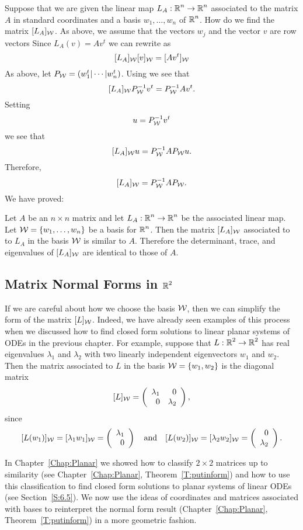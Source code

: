 \documentclass{ximera}
\begin{document}
Suppose that we are given the linear map $L_A:\mbox{$\Bbb{R}$}^n\to\mbox{$\Bbb{R}$}^n$ associated to
the matrix $A$ in standard coordinates and a basis $w_1,\ldots,w_n$ of $\mbox{$\Bbb{R}$}^n$.
How do we find the matrix $[L_A]_{\cal W}$. As above, we assume that the
vectors $w_j$ and the vector $v$ are row vectors  Since $L_A(v)=Av^t$ we can
rewrite  as
\[
[L_A]_{\cal W}[v]_{\cal W} = [Av^t]_{\cal W}
\]
As above, let $P_{\cal W}=(w_1^t|\cdots|w_n^t)$.  Using  we
see that
\[
[L_A]_{\cal W}P_{\cal W}^{-1} v^t = P_{\cal W}^{-1} Av^t.
\]
Setting
\[
u= P_{\cal W}^{-1} v^t
\]
we see that
\[
[L_A]_{\cal W}u = P_{\cal W}^{-1} A P_{\cal W}u.
\]
Therefore,
\[
[L_A]_{\cal W} = P_{\cal W}^{-1} AP_{\cal W}.
\]
We have proved:
\begin{theorem}
Let $A$ be an $n\times n$ matrix and let $L_A:\mbox{$\Bbb{R}$}^n\to\mbox{$\Bbb{R}$}^n$ be the associated
linear map.  Let ${\cal W} = \{w_1,\ldots,w_n\}$ be a basis for
$\mbox{$\Bbb{R}$}^n$.  Then the matrix $[L_A]_{\cal W}$ associated to to $L_A$ in the basis
${\cal W}$ is similar to $A$.  Therefore the determinant, trace,
and eigenvalues of $[L_A]_{\cal W}$ are identical to those of $A$.
\end{theorem}




\subsection*{Matrix Normal Forms in $\mbox{$\Bbb{R}$}^2$} 

If we are careful about how we choose the basis ${\cal W}$, then
we can simplify the form of the matrix $[L]_{\cal W}$.  Indeed, we
have already seen examples of this process when we discussed how
to find closed form solutions to linear planar systems of ODEs in
the previous chapter.  For example, suppose that $L:\mbox{$\Bbb{R}$}^2\to\mbox{$\Bbb{R}$}^2$
has real eigenvalues $\lambda_1$ and $\lambda_2$ with two
linearly independent eigenvectors $w_1$ and $w_2$.  Then the
matrix associated to $L$ in the basis ${\cal W} = \{w_1,w_2\}$
is the diagonal matrix
\begin{equation}   \label{e:diagcoord}
[L]_{\cal W} = \left(\begin{array}{rr} \lambda_1 & 0\\ 0 &\lambda_2\end{array}\right),
\end{equation}
since
\[
[L(w_1)]_{\cal W} = [\lambda_1w_1]_{\cal W} = \left(\begin{array}{r} \lambda_1 \\ 0\end{array}\right) \quad\mbox{and}\quad
[L(w_2)]_{\cal W} = [\lambda_2w_2]_{\cal W} = \left(\begin{array}{r} 0 \\ \lambda_2\end{array}\right).
\]

In Chapter~\ref{Chap:Planar} we showed how to classify $2\times 2$
matrices up to similarity (see Chapter~\ref{Chap:Planar},
Theorem~\ref{T:putinform}) and how to use this classification to find
closed form solutions to planar systems of linear ODEs (see
Section~\ref{S:6.5}).  We now use
the ideas of coordinates and matrices associated with bases to
reinterpret the normal form result (Chapter~\ref{Chap:Planar},
Theorem~\ref{T:putinform}) in a more geometric fashion.
\end{document}
